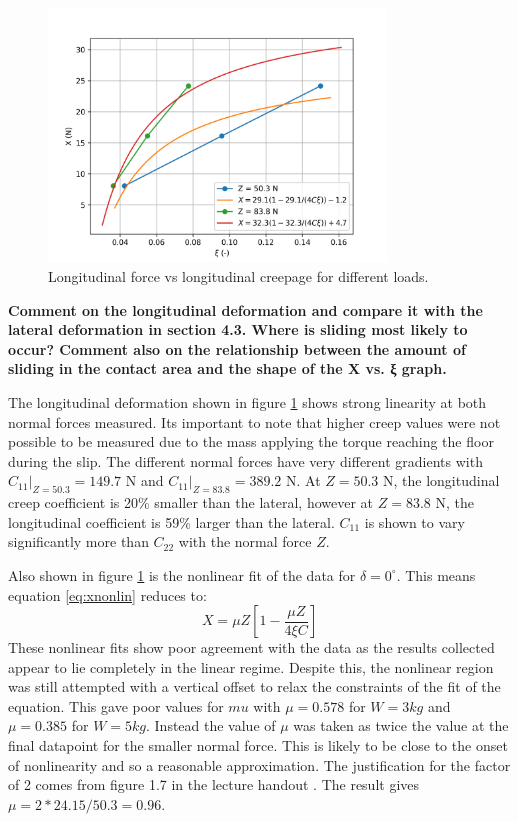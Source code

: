 \documentclass{article}
\begin{document}
\begin{figure}[H]
    \centering
    \includegraphics[width=0.8\textwidth]{52.png}
    \caption{Longitudinal force vs longitudinal creepage for different loads.}
    \label{fig:longitudinal_force_vs_creepage}
\end{figure}

\begin{center}
    \textbf{ Comment on the longitudinal deformation and compare it with the lateral deformation
    in section 4.3. Where is sliding most likely to occur? Comment also on the
    relationship between the amount of sliding in the contact area and the shape of the X
    vs. ξ graph.}
\end{center}

The longitudinal deformation shown in figure \ref{fig:longitudinal_force_vs_creepage} shows strong linearity at both normal forces measured.
Its important to note that higher creep values were not possible to be measured due to the mass applying the torque reaching the floor during the slip.
The different normal forces have very different gradients with $C_{11}|_{Z=50.3} = 149.7$ N and $C_{11}|_{Z=83.8} = 389.2$ N.
At $Z=50.3$ N, the longitudinal creep coefficient is 20\% smaller than the lateral, however at $Z=83.8$ N, the longitudinal coefficient is 59\% larger than the lateral.
$C_{11}$ is shown to vary significantly more than $C_{22}$ with the normal force $Z$. 

Also shown in figure \ref{fig:longitudinal_force_vs_creepage} is the nonlinear fit of the data for $\delta = 0^\circ$.
This means equation \ref{eq:xnonlin} reduces to:
\begin{equation}
    X = \mu Z \left[ 1 - \frac{\mu Z}{4\xi C}\right]
\end{equation}
These nonlinear fits show poor agreement with the data as the results collected appear to lie completely in the linear regime.
Despite this, the nonlinear region was still attempted with a vertical offset to relax the constraints of the fit of the equation.
This gave poor values for $mu$ with $\mu=0.578$ for $W=3kg$ and $\mu=0.385$ for $W=5kg$.
Instead the value of $\mu$ was taken as twice the value at the final datapoint for the smaller normal force.
This is likely to be close to the onset of nonlinearity and so a reasonable approximation.
The justification for the factor of 2 comes from figure 1.7 in the lecture handout \cite{notes}.
The result gives $\mu = 2*24.15/50.3 = 0.96$.
\end{document}
